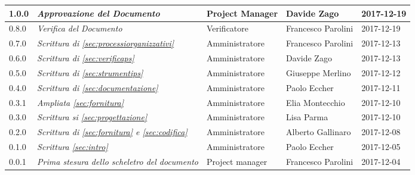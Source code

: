\begin{table}[H]
\begin{tabular}{p{2cm}|C{4cm}|C{3cm}|C{3cm}|R{2cm}}
		1.0.0  & \emph{Approvazione del Documento} & Project Manager & Davide Zago &  2017-12-19 \\
		\hline
		
		0.8.0  &  \emph{Verifica del Documento} & Verificatore & Francesco Parolini & 2017-12-19 \\
		\hline
		
		0.7.0  & \emph{Scrittura di \ref{sec:processiorganizzativi}}  & Amministratore & Francesco Parolini & 2017-12-13\\
		\hline
		
		0.6.0  & \emph{Scrittura di \ref{sec:verificaps}} &  Amministratore & Davide Zago  & 2017-12-13 \\
		\hline
		
		0.5.0  & \emph{Scrittura di \ref{sec:strumentips}} & Amministratore & Giuseppe Merlino & 2017-12-12\\
		\hline
		
		0.4.0  &\emph{Scrittura di \ref{sec:documentazione}}& Amministratore & Paolo Eccher  & 2017-12-11 \\
		\hline
		
		0.3.1 & \emph{Ampliata \ref{sec:fornitura}}& Amministratore & Elia Montecchio & 2017-12-10 \\
		\hline
		
		0.3.0 & \emph{Scrittura si \ref{sec:progettazione}} & Amministratore & Lisa Parma & 2017-12-10 \\
		\hline
		
		0.2.0 & \emph{Scrittura di \ref{sec:fornitura} e \ref{sec:codifica}} & Amministratore & Alberto Gallinaro & 2017-12-08 \\
		\hline
		
		0.1.0 & \emph{Scrittura \ref{sec:intro}} & Amministratore & Paolo Eccher & 2017-12-05 \\
		\hline
		
		0.0.1 &\emph{Prima stesura dello scheletro del documento} &  Project manager & Francesco Parolini & 2017-12-04 \\
		
	

	\end{tabular}
	
\end{table}


\clearpage